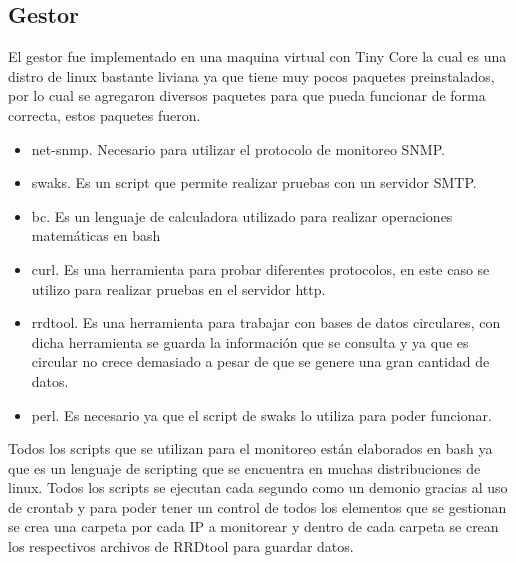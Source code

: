\documentclass[a4paper,12pt]{article}
\begin{document}
\subsection{Gestor}
El gestor fue implementado en una maquina virtual con Tiny Core la cual es una distro de linux bastante liviana ya que tiene muy pocos paquetes preinstalados, por lo cual se agregaron diversos paquetes para que pueda funcionar de forma correcta, estos paquetes fueron.
\begin{itemize}
 \item net-snmp. Necesario para utilizar el protocolo de monitoreo SNMP.
 \item swaks. Es un script que permite realizar pruebas con un servidor SMTP.
 \item bc. Es un lenguaje de calculadora utilizado para realizar operaciones matemáticas en bash
 \item curl. Es una herramienta para probar diferentes protocolos, en este caso se utilizo para realizar pruebas en el servidor http.
 \item rrdtool. Es una herramienta para trabajar con bases de datos circulares, con dicha herramienta se guarda la información que se consulta y ya que es circular no crece demasiado a pesar de que se genere una gran cantidad de datos.
 \item perl. Es necesario ya que el script de swaks lo utiliza para poder funcionar. 
\end{itemize}

Todos los scripts que se utilizan para el monitoreo están elaborados en bash ya que es un lenguaje de scripting que se encuentra en muchas distribuciones de linux. Todos los scripts se ejecutan cada segundo como un demonio gracias al uso de crontab y para poder tener un control de todos los elementos que se gestionan se crea una carpeta por cada IP a monitorear y dentro de cada carpeta se crean los respectivos archivos de RRDtool para guardar datos.
\end{document}
